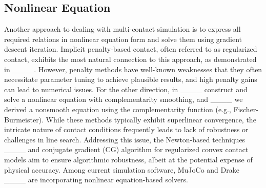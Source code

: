 \subsection{Nonlinear Equation}

Another approach to dealing with multi-contact simulation is to express all required relations in nonlinear equation form and solve them using gradient descent iteration. 
Implicit penalty-based contact, often referred to as regularized contact, exhibits the most natural connection to this approach, as demonstrated in ____. 
However, penalty methods have well-known weaknesses that they often necessitate parameter tuning to achieve plausible results, and high penalty gains can lead to numerical issues.
For the other direction, in ____ construct and solve a nonlinear equation with complementarity smoothing, and ____ we derived a nonsmooth equation using the complementarity function (e.g., Fischer-Burmeister).
While these methods typically exhibit superlinear convergence, the intricate nature of contact conditions frequently leads to lack of robustness or challenges in line search. 
Addressing this issue, the Newton-based techniques ____ and conjugate gradient (CG) algorithm for regularized convex contact models aim to ensure algorithmic robustness, albeit at the potential expense of physical accuracy. 
Among current simulation software, MuJoCo and Drake ____ are incorporating nonlinear equation-based solvers.


\begin{table}[t]
\centering
\caption{Comparison of contact models and solvers used in popular robotic simulators.}
\renewcommand{\arraystretch}{2.0}{
}
\label{table:simulator_compare}
\end{table}


